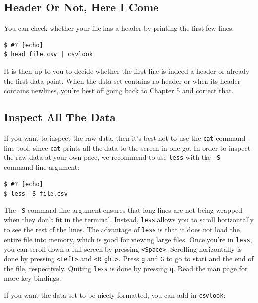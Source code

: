 \documentclass[
]{book}
\theoremstyle{definition}
\theoremstyle{definition}
\theoremstyle{definition}
\theoremstyle{remark}
\begin{document}
\hypertarget{header-or-not-here-i-come}{%
\subsection{Header Or Not, Here I Come}\label{header-or-not-here-i-come}}

You can check whether your file has a header by printing the first few lines:

\begin{verbatim}
$ #? [echo]
$ head file.csv | csvlook
\end{verbatim}

It is then up to you to decide whether the first line is indeed a header or already the first data point. When the data set contains no header or when its header contains newlines, you're best off going back to \protect\hyperlink{chapter-5-scrubbing-data}{Chapter 5} and correct that.

\hypertarget{inspect-all-the-data}{%
\subsection{Inspect All The Data}\label{inspect-all-the-data}}

If you want to inspect the raw data, then it's best not to use the \texttt{cat} command-line tool, since \texttt{cat} prints all the data to the screen in one go. In order to inspect the raw data at your own pace, we recommend to use \texttt{less} \citep{less} with the \texttt{-S} command-line argument:

\begin{verbatim}
$ #? [echo]
$ less -S file.csv
\end{verbatim}

The \texttt{-S} command-line argument ensures that long lines are not being wrapped when they don't fit in the terminal. Instead, \texttt{less} allows you to scroll horizontally to see the rest of the lines. The advantage of \texttt{less} is that it does not load the entire file into memory, which is good for viewing large files. Once you're in \texttt{less}, you can scroll down a full screen by pressing \texttt{\textless{}Space\textgreater{}}. Scrolling horizontally is done by pressing \texttt{\textless{}Left\textgreater{}} and \texttt{\textless{}Right\textgreater{}}. Press \texttt{g} and \texttt{G} to go to start and the end of the file, respectively. Quiting \texttt{less} is done by pressing \texttt{q}. Read the man page for more key bindings.

If you want the data set to be nicely formatted, you can add in \texttt{csvlook}:
\end{document}
